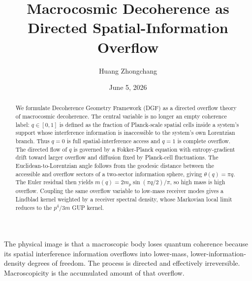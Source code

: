 \documentclass[aps,prl,twocolumn,superscriptaddress,nofootinbib,floatfix]{revtex4-2}
\begin{document}
\title{Macrocosmic Decoherence as Directed Spatial-Information Overflow}

\author{Huang Zhongchang}

\date{June 5, 2026}

\begin{abstract}
We formulate Decoherence Geometry Framework (DGF) as a directed overflow theory of macrocosmic decoherence. The central variable is no longer an empty coherence label: $q\in[0,1]$ is defined as the fraction of Planck-scale spatial cells inside a system's support whose interference information is inaccessible to the system's own Lorentzian branch. Thus $q=0$ is full spatial-interference access and $q=1$ is complete overflow. The directed flow of $q$ is governed by a Fokker-Planck equation with entropy-gradient drift toward larger overflow and diffusion fixed by Planck-cell fluctuations. The Euclidean-to-Lorentzian angle follows from the geodesic distance between the accessible and overflow sectors of a two-sector information sphere, giving $\theta(q)=\pi q$. The Euler residual then yields $m(q)=2m_p\sin(\pi q/2)/\pi$, so high mass is high overflow. Coupling the same overflow variable to low-mass receiver modes gives a Lindblad kernel weighted by a receiver spectral density, whose Markovian local limit reduces to the $p^4/3m$ GUP kernel.
\end{abstract}

\maketitle

The physical image is that a macroscopic body loses quantum coherence because its spatial interference information overflows into lower-mass, lower-information-density degrees of freedom. The process is directed and effectively irreversible. Macroscopicity is the accumulated amount of that overflow.
\end{document}
